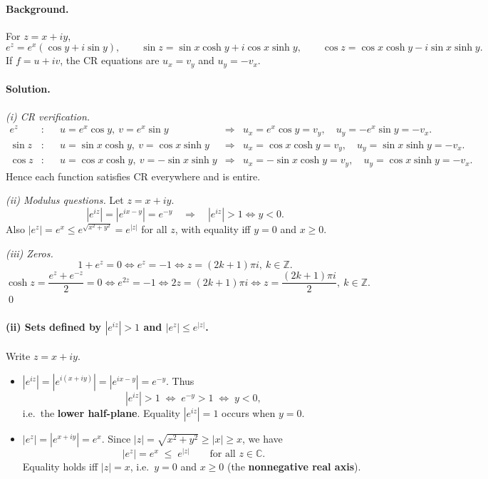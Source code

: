 \documentclass[11pt,a4paper]{article}
\theoremstyle{definition}
\theoremstyle{definition}
\theoremstyle{plain}
\theoremstyle{remark}
\begin{document}
\paragraph{Background.}
For $z=x+iy$,
\[
e^{z}=e^{x}(\cos y+i\sin y),\qquad
\sin z=\sin x\cosh y+i\cos x\sinh y,\qquad
\cos z=\cos x\cosh y-i\sin x\sinh y.
\]
If $f=u+iv$, the CR equations are $u_x=v_y$ and $u_y=-v_x$.

\paragraph{Solution.}

\emph{(i) CR verification.}
\begin{align*}
	e^{z}&:&& u=e^{x}\cos y,\ v=e^{x}\sin y
	&\Rightarrow& u_x=e^{x}\cos y=v_y,\quad u_y=-e^{x}\sin y=-v_x.\\
	\sin z&:&& u=\sin x\cosh y,\ v=\cos x\sinh y
	&\Rightarrow& u_x=\cos x\cosh y=v_y,\quad u_y=\sin x\sinh y=-v_x.\\
	\cos z&:&& u=\cos x\cosh y,\ v=-\sin x\sinh y
	&\Rightarrow& u_x=-\sin x\cosh y=v_y,\quad u_y=\cos x\sinh y=-v_x.
\end{align*}
Hence each function satisfies CR everywhere and is entire.

\medskip
\emph{(ii) Modulus questions.} Let $z=x+iy$.
\[
|e^{iz}|=|e^{ix-y}|=e^{-y}\quad\Rightarrow\quad |e^{iz}|>1 \iff y<0.
\]
Also $|e^{z}|=e^{x}\le e^{\sqrt{x^{2}+y^{2}}}=e^{|z|}$ for all $z$, with equality iff $y=0$ and $x\ge0$.

\medskip
\emph{(iii) Zeros.}
\[
1+e^{z}=0 \iff e^{z}=-1 \iff z=(2k+1)\pi i,\ k\in\mathbb{Z}.
\]
\[
\cosh z=\frac{e^{z}+e^{-z}}{2}=0 \iff e^{2z}=-1
\iff 2z=(2k+1)\pi i \iff z=\frac{(2k+1)\pi i}{2},\ k\in\mathbb{Z}.
\]
\qed

\paragraph{(ii) Sets defined by $|e^{iz}|>1$ and $|e^{z}|\le e^{|z|}$.}
Write $z=x+iy$.
\begin{itemize}
	\item $|e^{iz}|=|e^{i(x+iy)}|=|e^{ix-y}|=e^{-y}$. Thus
	\[
	|e^{iz}|>1 \;\Longleftrightarrow\; e^{-y}>1 \;\Longleftrightarrow\; y<0,
	\]
	i.e.\ the \textbf{lower half-plane}. Equality $|e^{iz}|=1$ occurs when $y=0$.
	
	\item $|e^{z}|=|e^{x+iy}|=e^{x}$. Since $|z|=\sqrt{x^{2}+y^{2}}\ge |x|\ge x$, we have
	\[
	|e^{z}| = e^{x} \;\le\; e^{|z|}\qquad\text{for all }z\in\mathbb{C}.
	\]
	Equality holds iff $|z|=x$, i.e.\ $y=0$ and $x\ge 0$ (the \textbf{nonnegative real axis}).
\end{itemize}
\end{document}
